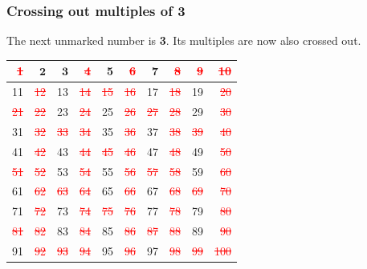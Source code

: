 \documentclass[12pt]{book}
\newcommand{\crossout}[1]{\textcolor{red}{\sout{#1}}}
\begin{document}
  \subsubsection*{Crossing out multiples of 3}
  The next unmarked number is \textbf{3}. Its multiples are now also crossed out.
  \begin{center}
  \renewcommand{\arraystretch}{1.15}
  \begin{tabular}{|*{10}{r|}}
    \hline 
    \cellcolor{gray!25}\crossout{1}   & \(\mathbf{2}\) & \(\mathbf{3}\) & \crossout{4} & 5 & \crossout{6} & 7 & \crossout{8} & \crossout{9} & \crossout{10} \\
    \hline 
    11 & \crossout{12} & 13 & \crossout{14} & \crossout{15} & \crossout{16} & 17 & \crossout{18} & 19 & \crossout{20} \\
    \hline 
    \crossout{21} & \crossout{22} & 23 & \crossout{24} & 25 & \crossout{26} & \crossout{27} & \crossout{28} & 29 & \crossout{30} \\
    \hline 
    31 & \crossout{32} & \crossout{33} & \crossout{34} & 35 & \crossout{36} & 37 & \crossout{38} & \crossout{39} & \crossout{40} \\
    \hline 
    41 & \crossout{42} & 43 & \crossout{44} & \crossout{45} & \crossout{46} & 47 & \crossout{48} & 49 & \crossout{50} \\
    \hline 
    \crossout{51} & \crossout{52} & 53 & \crossout{54} & 55 & \crossout{56} & \crossout{57} & \crossout{58} & 59 & \crossout{60} \\
    \hline 
    61 & \crossout{62} & \crossout{63} & \crossout{64} & 65 & \crossout{66} & 67 & \crossout{68} & \crossout{69} & \crossout{70} \\
    \hline 
    71 & \crossout{72} & 73 & \crossout{74} & \crossout{75} & \crossout{76} & 77 & \crossout{78} & 79 & \crossout{80} \\
    \hline 
    \crossout{81} & \crossout{82} & 83 & \crossout{84} & 85 & \crossout{86} & \crossout{87} & \crossout{88} & 89 & \crossout{90} \\
    \hline 
    91 & \crossout{92} & \crossout{93} & \crossout{94} & 95 & \crossout{96} & 97 & \crossout{98} & \crossout{99} & \crossout{100} \\
    \hline 
  \end{tabular}
  \end{center}
\end{document}

